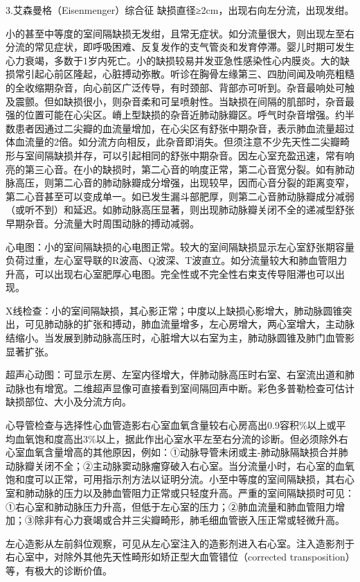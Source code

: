 3.艾森曼格（Eisenmenger）综合征 缺损直径≥2cm，出现右向左分流，出现发绀。

小的甚至中等度的室间隔缺损无发绀，且常无症状。如分流量很大，则出现左至右分流的常见症状，即呼吸困难、反复发作的支气管炎和发育停滞。婴儿时期可发生心力衰竭，多数于1岁内死亡。小的缺损较易并发亚急性感染性心内膜炎。大的缺损常引起心前区隆起，心脏搏动弥散。听诊在胸骨左缘第三、四肋间闻及响亮粗糙的全收缩期杂音，向心前区广泛传导，有时颈部、背部亦可听到。杂音最响处可触及震颤。但如缺损很小，则杂音柔和可呈喷射性。当缺损在间隔的肌部时，杂音最强的位置可能在心尖区。嵴上型缺损的杂音近肺动脉瓣区。呼气时杂音增强。约半数患者因通过二尖瓣的血流量增加，在心尖区有舒张中期杂音，表示肺血流量超过体血流量的2倍。如分流方向相反，此杂音即消失。但须注意不少先天性二尖瓣畸形与室间隔缺损并存，可以引起相同的舒张中期杂音。因左心室充盈迅速，常有响亮的第三心音。在小的缺损时，第二心音的响度正常，第二心音宽分裂。如有肺动脉高压，则第二心音的肺动脉瓣成分增强，出现较早，因而心音分裂的距离变窄，第二心音甚至可以变成单一。如已发生漏斗部肥厚，则第二心音肺动脉瓣成分减弱（或听不到）和延迟。如肺动脉高压显著，则出现肺动脉瓣关闭不全的递减型舒张早期杂音。分流量大时周围动脉的搏动减弱。

心电图：小的室间隔缺损的心电图正常。较大的室间隔缺损显示左心室舒张期容量负荷过重，左心室导联的R波高、Q波深、T波直立。如分流量较大和肺血管阻力升高，可以出现右心室肥厚心电图。完全性或不完全性右束支传导阻滞也可以出现。

X线检查：小的室间隔缺损，其心影正常；中度以上缺损心影增大，肺动脉圆锥突出，可见肺动脉的扩张和搏动，肺血流量增多，左心房增大，两心室增大，主动脉结缩小。当发展到肺动脉高压时，心脏增大以右室为主，肺动脉圆锥及肺门血管影显著扩张。

超声心动图：可显示左房、左室内径增大，伴肺动脉高压时右室、右室流出道和肺动脉也有增宽。二维超声显像可直接看到室间隔回声中断。彩色多普勒检查可估计缺损部位、大小及分流方向。

心导管检查与选择性心血管造影右心室血氧含量较右心房高出0.9容积\%以上或平均血氧饱和度高出3\%以上，据此作出心室水平左至右分流的诊断。但必须除外右心室血氧含量增高的其他原因，例如：①动脉导管未闭或主-肺动脉隔缺损合并肺动脉瓣关闭不全；②主动脉窦动脉瘤穿破入右心室。当分流量小时，右心室的血氧饱和度可以正常，可用指示剂方法以证明分流。小至中等度的室间隔缺损，其右心室和肺动脉的压力以及肺血管阻力正常或只轻度升高。严重的室间隔缺损时可见：①右心室和肺动脉压力升高，但低于左心室的压力；②肺血流量和肺血管阻力增加；③除非有心力衰竭或合并三尖瓣畸形，肺毛细血管嵌入压正常或轻微升高。

左心造影从左前斜位观察，可见从左心室注入的造影剂进入右心室。注入造影剂于右心室中，对除外其他先天性畸形如矫正型大血管错位（corrected
transposition）等，有极大的诊断价值。

